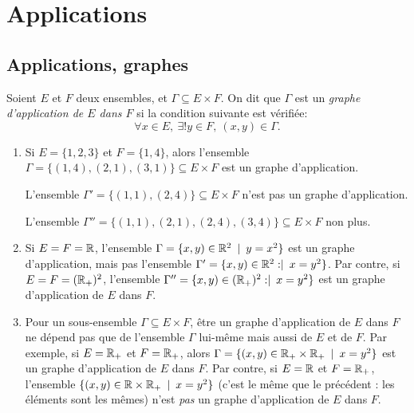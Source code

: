 \chapter{Applications}



\section{Applications, graphes}

\begin{definition}
Soient $E$ et $F$ deux ensembles, et $\Gamma \subseteq E\times F$. On dit que $\Gamma$ est un \emph{graphe d'application de $E$ dans $F$} si la condition suivante est vérifiée:
\[\forall x\in E, \: \exists! y\in F, \: (x,y) \in \Gamma.\]
\end{definition}

\begin{exemple}
\begin{enumerate}
\item Si $E = \{1,2,3\}$ et $F = \{1,4\}$, alors l'ensemble $\Gamma = \{(1,4),(2,1),(3,1)\} \subseteq E\times F$ est un graphe d'application.

L'ensemble $\Gamma' = \{(1,1),(2,4)\} \subseteq E\times F$ n'est pas un graphe d'application.

L'ensemble $\Gamma'' = \{(1,1),(2,1),(2,4),(3,4)\} \subseteq E\times F$ non plus.
\item Si $E = F = \mathbb{R}$, l'ensemble $\Gamma = \{x,y)\in \mathbb{R}^2 \:\mid\: y=x^2\}$ est un graphe d'application, mais pas l'ensemble $\Gamma' = \{x,y)\in \mathbb{R}^2 :\mid\: x=y^2\}$. Par contre, si $E=F=(\mathbb{R}_+)^2$, l'ensemble  $\Gamma'' = \{x,y)\in (\mathbb{R}_+)^2 :\mid\: x=y^2\}$ est un graphe d'application de $E$ dans $F$.
\item Pour un sous-ensemble $\Gamma\subseteq E\times F$, être un graphe d'application de $E$ dans $F$ ne dépend pas que de l'ensemble $\Gamma$ lui-même mais aussi de $E$ et de $F$. Par exemple, si $E=\mathbb{R}_+$ et $F=\mathbb{R}_+$, alors $\Gamma = \{(x,y)\in \mathbb{R}_+\times \mathbb{R}_+ \:\mid\: x=y^2\}$ est un graphe d'application de $E$ dans $F$. Par contre, si $E=\mathbb{R}$ et $F=\mathbb{R}_+$, l'ensemble $\{(x,y)\in \mathbb{R}\times \mathbb{R}_+ \:\mid\: x=y^2\}$ (c'est le même que le précédent : les éléments sont les mêmes) n'est \emph{pas} un graphe d'application de $E$ dans $F$.
\end{enumerate}
\end{exemple}

